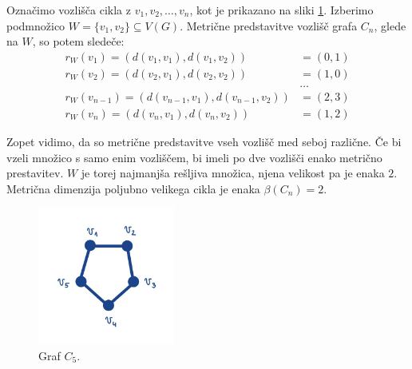 \documentclass[mat1, tisk]{fmfdelo}
\newcommand{\1}{(1, 1, \ldots, 1)}
\newcommand{\2}{(2, 2, \ldots, 2)}
\begin{document}
\begin{primer}\label{pr:mdim_cikel}
    Označimo vozlišča cikla z $v_1, v_2, \ldots, v_n$, kot je prikazano na sliki \ref{fig:cikel}. 
    Izberimo podmnožico $W = \{ v_1, v_2 \} \subseteq V(G).$ Metrične predstavitve vozlišč grafa $C_n$, 
    glede na $W$, so potem sledeče:
    \begin{align*}
        r_W(v_1) = (d(v_1, v_1), d(v_1, v_2)) & = (0, 1) \\
        r_W(v_2) = (d(v_2, v_1), d(v_2, v_2)) & = (1, 0) \\
        & \dots \\
        r_W(v_{n-1}) = (d(v_{n-1}, v_1), d(v_{n-1}, v_2)) & = (2, 3) \\
        r_W(v_n) = (d(v_n, v_1), d(v_n, v_2)) & = (1, 2)
    \end{align*}
    
    Zopet vidimo, da so metrične predstavitve vseh vozlišč med seboj različne. Če bi vzeli 
    množico s samo enim vozliščem, bi imeli po dve vozlišči enako metrično prestavitev.
    $W$  je torej najmanjša rešljiva množica, njena velikost pa je enaka $2$. Metrična 
    dimenzija poljubno velikega cikla je enaka $\beta(C_n) = 2.$

    \begin{figure}[h]
        \centering
        \includegraphics[width=0.4\textwidth]{IMG_cikel.jpg}
        \caption{Graf $C_5$.}
        \label{fig:cikel}
    \end{figure}

\end{primer}
\end{document}
